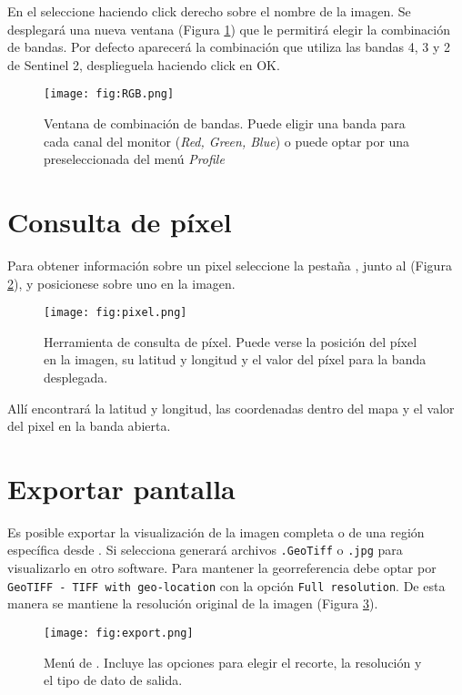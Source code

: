 En el  seleccione  haciendo click derecho sobre el nombre de la imagen. Se desplegará una nueva ventana (Figura \ref{fig:RGB}) que le permitirá elegir la combinación de bandas. Por defecto aparecerá la combinación que utiliza las bandas 4, 3 y 2 de Sentinel 2, desplieguela haciendo click en OK.

\begin{figure}[h!]
    \centering
    \texttt{[image: fig:RGB.png]}
    \caption{Ventana de combinación de bandas. Puede eligir una banda para cada canal del monitor (\emph{Red, Green, Blue}) o puede optar por una preseleccionada del menú \emph{Profile}}
    \label{fig:RGB}
\end{figure}


\section{Consulta de píxel}

Para obtener información sobre un pixel seleccione la pestaña , junto al  (Figura \ref{fig:pixel}), y posicionese  sobre uno en la imagen.

\begin{figure}[h!]
    \centering
    \texttt{[image: fig:pixel.png]}
    \caption{Herramienta de consulta de píxel. Puede verse la posición del píxel en la imagen, su latitud y longitud y el valor del píxel para la banda desplegada.}
    \label{fig:pixel}
\end{figure}

Allí encontrará la latitud y longitud, las coordenadas dentro del mapa y el valor del pixel en la banda abierta.

\section{Exportar pantalla}

Es posible exportar la visualización de la imagen completa o de una región específica desde .
Si selecciona  generará archivos \texttt{.GeoTiff} o \texttt{.jpg} para visualizarlo en otro software. Para mantener la georreferencia debe optar por \texttt{GeoTIFF - TIFF with geo-location} con la opción \texttt{Full resolution}. De esta manera se mantiene la resolución original de la imagen (Figura \ref{fig:export}).

\begin{figure}[h!]
    \centering
    \texttt{[image: fig:export.png]}
    \caption{Menú de . Incluye las opciones para elegir el recorte, la resolución y el tipo de dato de salida.}
    \label{fig:export}
\end{figure}

